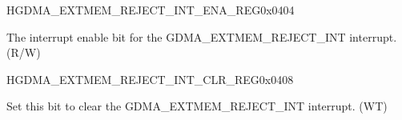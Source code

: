 \begin{register}{H}{GDMA\_EXTMEM\_REJECT\_INT\_ENA\_REG}{0x{}0404}\label{regdesc:DMAEXTMEMREJECTINTENAREG}
%
%
\regnewline%
\begin{regdesc}\begin{reglist}
\label{fielddesc:DMAEXTMEMREJECTINTENA}\item [GDMA\_EXTMEM\_REJECT\_INT\_ENA] The interrupt enable bit for the GDMA\_EXTMEM\_REJECT\_INT interrupt. (R/W)
\end{reglist}\end{regdesc}
\end{register}


\begin{register}{H}{GDMA\_EXTMEM\_REJECT\_INT\_CLR\_REG}{0x{}0408}\label{regdesc:DMAEXTMEMREJECTINTCLRREG}
%
%
\regnewline%
\begin{regdesc}\begin{reglist}
\label{fielddesc:DMAEXTMEMREJECTINTCLR}\item [GDMA\_EXTMEM\_REJECT\_INT\_CLR] Set this bit to clear the GDMA\_EXTMEM\_REJECT\_INT interrupt. (WT)
\end{reglist}\end{regdesc}
\end{register}


